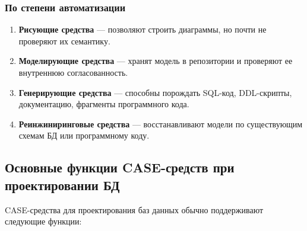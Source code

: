 \documentclass[12pt,a4paper]{article}
\theoremstyle{remark}
\begin{document}
\subsubsection{По степени автоматизации}

\begin{enumerate}
    \item \textbf{Рисующие средства} --- позволяют строить диаграммы, но почти не проверяют их семантику.
    \item \textbf{Моделирующие средства} --- хранят модель в репозитории и проверяют ее внутреннюю согласованность.
    \item \textbf{Генерирующие средства} --- способны порождать SQL-код, DDL-скрипты, документацию, фрагменты программного кода.
    \item \textbf{Реинжиниринговые средства} --- восстанавливают модели по существующим схемам БД или программному коду.
\end{enumerate}

\subsection{Основные функции CASE-средств при проектировании БД}

CASE-средства для проектирования баз данных обычно поддерживают следующие функции:
\end{document}
